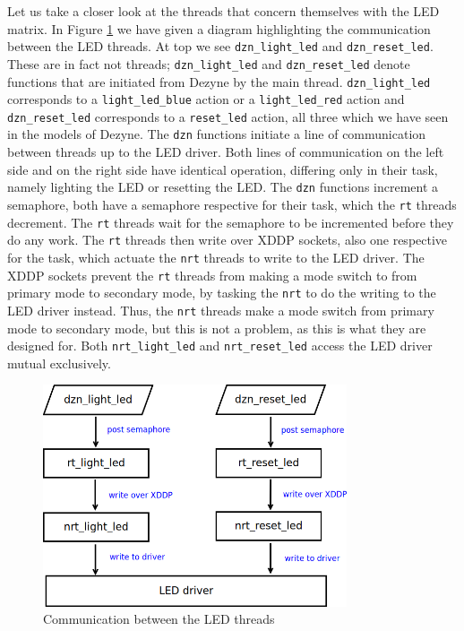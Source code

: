 \documentclass[12pt]{scrreprt}
\begin{document}
Let us take a closer look at the threads that concern themselves with the LED matrix. In Figure \ref{fig:led_threads} we have given a diagram highlighting the communication between the LED threads. At top we see \texttt{dzn\_light\_led} and \texttt{dzn\_reset\_led}. These are in fact not threads; \texttt{dzn\_light\_led} and \texttt{dzn\_reset\_led} denote functions that are initiated from Dezyne by the main thread. \texttt{dzn\_light\_led} corresponds to a \texttt{light\_led\_blue} action or a \texttt{light\_led\_red} action and \texttt{dzn\_reset\_led} corresponds to a \texttt{reset\_led} action, all three which we have seen in the models of Dezyne. The \texttt{dzn} functions initiate a line of communication between threads up to the LED driver. Both lines of communication on the left side and on the right side have identical operation, differing only in their task, namely lighting the LED or resetting the LED. The \texttt{dzn} functions increment a semaphore, both have a semaphore respective for their task, which the \texttt{rt} threads decrement. The \texttt{rt} threads wait for the semaphore to be incremented before they do any work. The \texttt{rt} threads then write over XDDP sockets, also one respective for the task, which actuate the \texttt{nrt} threads to write to the LED driver. The XDDP sockets prevent the \texttt{rt} threads from making a mode switch to from primary mode to secondary mode, by tasking the \texttt{nrt} to do the writing to the LED driver instead. Thus, the \texttt{nrt} threads make a mode switch from primary mode to secondary mode, but this is not a problem, as this is what they are designed for. Both \texttt{nrt\_light\_led} and \texttt{nrt\_reset\_led} access the LED driver mutual exclusively.

\begin{figure}[H]
    \centering
    \includegraphics[width=0.8\textwidth]{Figures/results/modelling_figures/Threading/LED_threads.png}
    \caption{Communication between the LED threads}
    \label{fig:led_threads}
\end{figure}
\end{document}
